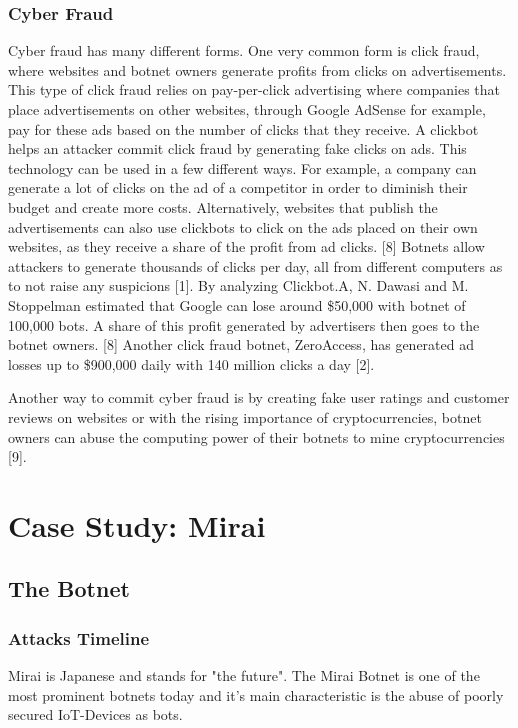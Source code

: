 		\subsubsection{Cyber Fraud}
		Cyber fraud has many different forms. One very common form is click fraud, where websites and botnet owners generate profits from clicks on advertisements. This type of click fraud relies on pay-per-click advertising where companies that place advertisements on other websites, through Google AdSense for example, pay for these ads based on the number of clicks that they receive. A clickbot helps an attacker commit click fraud by generating fake clicks on ads. This technology can be used in a few different ways. For example, a company can generate a lot of clicks on the ad of a competitor in order to diminish their budget and create more costs. Alternatively, websites that publish the advertisements can also use clickbots to click on the ads placed on their own websites, as they receive a share of the profit from ad clicks. [8] Botnets allow attackers to generate thousands of clicks per day, all from different computers as to not raise any suspicions [1]. By analyzing Clickbot.A, N. Dawasi and M. Stoppelman estimated that Google can lose around \$50,000 with botnet of 100,000 bots. A share of this profit generated by advertisers then goes to the botnet owners. [8] Another click fraud botnet, ZeroAccess, has generated ad losses up to \$900,000 daily with 140 million clicks a day [2].

Another way to commit cyber fraud is by creating fake user ratings and customer reviews on websites or with the rising importance of cryptocurrencies, botnet owners can abuse the computing power of their botnets to mine cryptocurrencies [9].
		
\section{Case Study: Mirai}
	\subsection{The Botnet}
	\subsubsection{Attacks Timeline}
	Mirai is Japanese and stands for "the future". The Mirai Botnet is one of the most prominent botnets today and it's main characteristic is the abuse of poorly secured IoT-Devices as bots.
	
